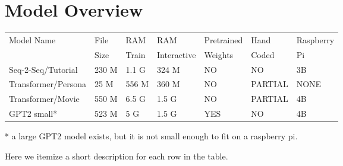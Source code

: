 \section{Model Overview}



\begin{table}[h]
	
	\begin{center}
		
		
		\begin{tabular}{lllllll}
			
			Model Name    & File  & RAM  & RAM  & Pretrained  & Hand & Raspberry \\
			&  Size & Train   & Interactive   & Weights & Coded &   Pi \\
			\hline
			\hline
			Seq-2-Seq/Tutorial & 230 M     & 1.1 G & 324 M & NO                 & NO  &   3B \\
			Transformer/Persona   & 25 M      & 556 M & 360 M & NO         & PARTIAL  & NONE \\
			Transformer/Movie   & 550 M      & 6.5 G & 1.5 G & NO         & PARTIAL    & 4B  \\
			GPT2 small*   & 523 M     & 5 G   & 1.5 G & YES                & NO     &  4B \\
			\hline
		\end{tabular}
		
		* a large GPT2 model exists, but it is not small enough to fit on a raspberry pi.
		
		
	\end{center}
	
	\label{fig:modeloverview}
\end{table}


Here we itemize a short description for each row in the table.

